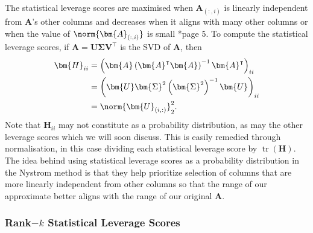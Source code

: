 The statistical leverage scores are maximised when $\bm{A}_{(:,i)}$ is linearly independent from $\bm{A}$'s other columns and decreases when it aligns with many other columns or when the value of $\norm{\bm{A}_{(:,i)}}$ is small \cite{DBLP:journals/corr/CohenMM15}*{page 5}. To compute the statistical leverage scores, if $\bm{A} = \bm{U} \bm{\Sigma} \bm{V}^{\intercal}$ is the SVD of $\bm{A}$, then
\begin{align*}
    \bm{H}_{ii} & = \left( \bm{A} \left( \bm{A}^{\intercal} \bm{A} \right)^{-1} \bm{A}^{\intercal} \right)_{ii} \\
                & = \left( \bm{U} \bm{\Sigma}^{2} \left( \bm{\Sigma}^{2} \right)^{-1} \bm{U} \right)_{ii}       \\
                & = \norm{\bm{U}_{(i,:)}}_2^2.
\end{align*}
Note that $\bm{H}_{ii}$ may not constitute as a probability distribution, as may the other leverage scores which we will soon discuss. This is easily remedied through normalisation, in this case dividing each statistical leverage score by $\operatorname{tr} \left( \bm{H} \right)$. The idea behind using statistical leverage scores as a probability distribution in the Nystrom method is that they help prioritize selection of columns that are more linearly independent from other columns so that the range of our approximate better aligns with the range of our original $\bm{A}$.

\subsubsection{Rank$-k$ Statistical Leverage Scores}

